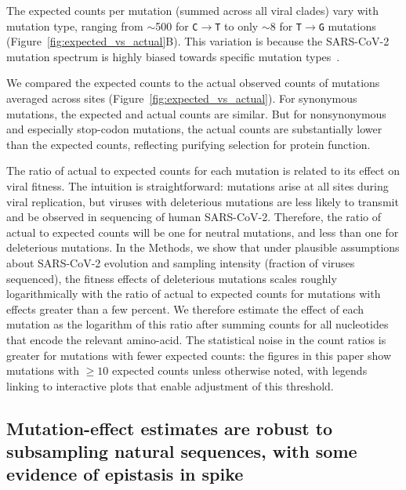 \documentclass[9pt,twocolumn,twoside]{gsajnl_modified}
\begin{document}
The expected counts per mutation (summed across all viral clades) vary with mutation type, ranging from $\sim$500 for \texttt{C$\rightarrow$T} to only $\sim$8 for \texttt{T$\rightarrow$G} mutations (Figure~\ref{fig:expected_vs_actual}B).
This variation is because the SARS-CoV-2 mutation spectrum is highly biased towards specific mutation types~\citep{bloom2022evolution,ruis2022mutational,de2021mutation,neher2022contributions}.

We compared the expected counts to the actual observed counts of mutations averaged across sites (Figure~\ref{fig:expected_vs_actual}).
For synonymous mutations, the expected and actual counts are similar.
But for nonsynonymous and especially stop-codon mutations, the actual counts are substantially lower than the expected counts, reflecting purifying selection for protein function.

The ratio of actual to expected counts for each mutation is related to its effect on viral fitness.
The intuition is straightforward: mutations arise at all sites during viral replication, but viruses with deleterious mutations are less likely to transmit and be observed in sequencing of human SARS-CoV-2.
Therefore, the ratio of actual to expected counts will be one for neutral mutations, and less than one for deleterious mutations.
In the Methods, we show that under plausible assumptions about SARS-CoV-2 evolution and sampling intensity (fraction of viruses sequenced), the fitness effects of deleterious mutations scales roughly logarithmically with the ratio of actual to expected counts for mutations with effects greater than a few percent.
We therefore estimate the effect of each mutation as the logarithm of this ratio after summing counts for all nucleotides that encode the relevant amino-acid.
The statistical noise in the count ratios is greater for mutations with fewer expected counts: the figures in this paper show mutations with $\ge10$ expected counts unless otherwise noted, with legends linking to interactive plots that enable adjustment of this threshold.

\subsection*{Mutation-effect estimates are robust to subsampling natural sequences, with some evidence of epistasis in spike}
\end{document}
